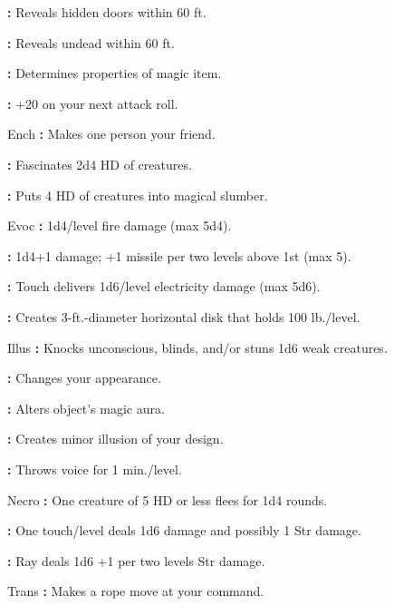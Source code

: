 \begin{multicols}{2}
\begin{description*}
\item \tabto{5mm} \textbf{:} Reveals hidden doors within 60 ft.
\item \tabto{5mm} \textbf{:} Reveals undead within 60 ft.
\item \tabto{5mm} \textbf{:} Determines properties of magic item.
\item \tabto{5mm} \textbf{:} +20 on your next attack roll.
\item Ench \tabto{5mm} \textbf{:} Makes one person your friend.
\item \tabto{5mm} \textbf{:} Fascinates 2d4 HD of creatures.
\item \tabto{5mm} \textbf{:} Puts 4 HD of creatures into magical slumber.
\item Evoc \tabto{5mm} \textbf{:} 1d4/level fire damage (max 5d4).
\item \tabto{5mm} \textbf{:} 1d4+1 damage; +1 missile per two levels above 1st (max 5).
\item \tabto{5mm} \textbf{:} Touch delivers 1d6/level electricity damage (max 5d6).
\item \tabto{5mm} \textbf{:} Creates 3-ft.-diameter horizontal disk that holds 100 lb./level.
\item Illus \tabto{5mm} \textbf{:} Knocks unconscious, blinds, and/or stuns 1d6 weak creatures.
\item \tabto{5mm} \textbf{:} Changes your appearance.
\item \tabto{5mm} \textbf{:} Alters object’s magic aura.
\item \tabto{5mm} \textbf{:} Creates minor illusion of your design.
\item \tabto{5mm} \textbf{:} Throws voice for 1 min./level.
\item Necro \tabto{5mm} \textbf{:} One creature of 5 HD or less flees for 1d4 rounds.
\item \tabto{5mm} \textbf{:} One touch/level deals 1d6 damage and possibly 1 Str damage.
\item \tabto{5mm} \textbf{:} Ray deals 1d6 +1 per two levels Str damage.
\item Trans \tabto{5mm} \textbf{:} Makes a rope move at your command.

\end{description*}
\end{multicols}
